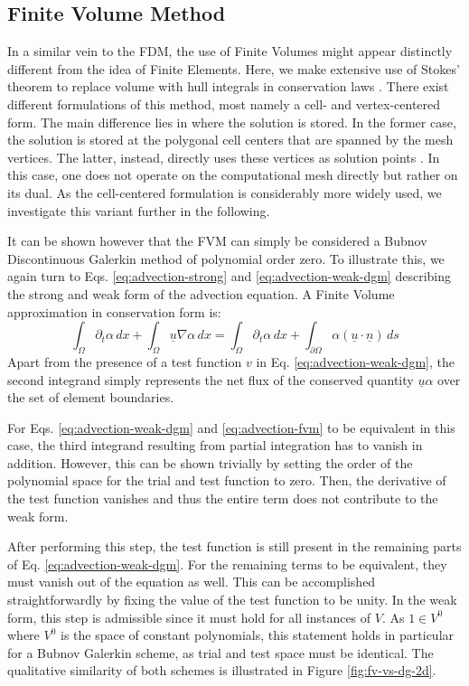 \documentclass[asi,article,submit,moreauthors]{Definitions/mdpi}
\begin{document}
\subsection{Finite Volume Method}\label{sec:fvm}

In a similar vein to the FDM, the use of Finite Volumes might appear distinctly different from the idea of Finite Elements.
Here, we make extensive use of Stokes' theorem to replace volume with hull integrals in conservation laws \cite{eymardFiniteVolumeMethods2000}.
There exist different formulations of this method, most namely a cell- and vertex-centered form.
The main difference lies in where the solution is stored.
In the former case, the solution is stored at the polygonal cell centers that are spanned by the mesh vertices.
The latter, instead, directly uses these vertices as solution points \cite{moukalledFiniteVolumeMethod2016}.
In this case, one does not operate on the computational mesh directly but rather on its dual.
As the cell-centered formulation is considerably more widely used, we investigate this variant further in the following.

It can be shown however that the FVM can simply be considered a Bubnov Discontinuous Galerkin method of polynomial order zero.
To illustrate this, we again turn to Eqs. \ref{eq:advection-strong} and \ref{eq:advection-weak-dgm} describing the strong and weak form of the advection equation.
A Finite Volume approximation in conservation form is:
\begin{equation}\label{eq:advection-fvm}
    \int_\Omega \partial_t \alpha \,dx + \int_\Omega \underline{u} \nabla \alpha \,dx =  \int_\Omega \partial_t \alpha \,dx + \int_{\partial\Omega} \alpha (\underline{u}\cdot\underline{n}) \,ds
\end{equation}
Apart from the presence of a test function $v$ in Eq. \ref{eq:advection-weak-dgm}, the second integrand simply represents the net flux of the conserved quantity $\underline{u}\alpha$ over the set of element boundaries.

For Eqs. \ref{eq:advection-weak-dgm} and \ref{eq:advection-fvm} to be equivalent in this case, the third integrand resulting from partial integration has to vanish in addition.
However, this can be shown trivially by setting the order of the polynomial space for the trial and test function to zero.
Then, the derivative of the test function vanishes and thus the entire term does not contribute to the weak form.

After performing this step, the test function is still present in the remaining parts of Eq. \ref{eq:advection-weak-dgm}.
For the remaining terms to be equivalent, they must vanish out of the equation as well.
This can be accomplished straightforwardly by fixing the value of the test function to be unity.
In the weak form, this step is admissible since it must hold for all instances of $V$.
As $1 \in V^0$ where $V^0$ is the space of constant polynomials, this statement holds in particular for a Bubnov Galerkin scheme, as trial and test space must be identical.
The qualitative similarity of both schemes is illustrated in Figure \ref{fig:fv-vs-dg-2d}.
\end{document}
